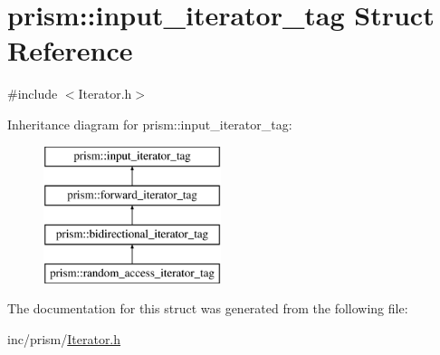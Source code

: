 \hypertarget{structprism_1_1input__iterator__tag}{}\section{prism\+:\+:input\+\_\+iterator\+\_\+tag Struct Reference}
\label{structprism_1_1input__iterator__tag}


{\ttfamily \#include $<$Iterator.\+h$>$}

Inheritance diagram for prism\+:\+:input\+\_\+iterator\+\_\+tag\+:\begin{figure}[H]
\begin{center}
\leavevmode
\includegraphics[height=4.000000cm]{structprism_1_1input__iterator__tag}
\end{center}
\end{figure}


The documentation for this struct was generated from the following file\+:\begin{DoxyCompactItemize}
\item 
inc/prism/\hyperlink{_iterator_8h}{Iterator.\+h}\end{DoxyCompactItemize}
